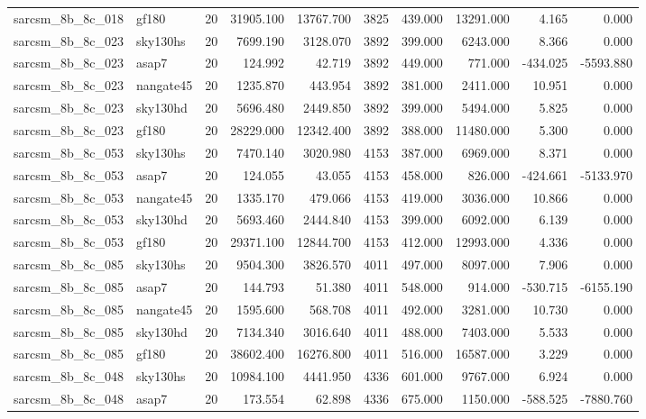 \documentclass{article}
\begin{document}
\begin{longtable}{llrrrrrrrr}
sarcsm\_8b\_8c\_018 & gf180 & 20 & 31905.100 & 13767.700 & 3825 & 439.000 & 13291.000 & 4.165 & 0.000 \\
sarcsm\_8b\_8c\_023 & sky130hs & 20 & 7699.190 & 3128.070 & 3892 & 399.000 & 6243.000 & 8.366 & 0.000 \\
sarcsm\_8b\_8c\_023 & asap7 & 20 & 124.992 & 42.719 & 3892 & 449.000 & 771.000 & -434.025 & -5593.880 \\
sarcsm\_8b\_8c\_023 & nangate45 & 20 & 1235.870 & 443.954 & 3892 & 381.000 & 2411.000 & 10.951 & 0.000 \\
sarcsm\_8b\_8c\_023 & sky130hd & 20 & 5696.480 & 2449.850 & 3892 & 399.000 & 5494.000 & 5.825 & 0.000 \\
sarcsm\_8b\_8c\_023 & gf180 & 20 & 28229.000 & 12342.400 & 3892 & 388.000 & 11480.000 & 5.300 & 0.000 \\
sarcsm\_8b\_8c\_053 & sky130hs & 20 & 7470.140 & 3020.980 & 4153 & 387.000 & 6969.000 & 8.371 & 0.000 \\
sarcsm\_8b\_8c\_053 & asap7 & 20 & 124.055 & 43.055 & 4153 & 458.000 & 826.000 & -424.661 & -5133.970 \\
sarcsm\_8b\_8c\_053 & nangate45 & 20 & 1335.170 & 479.066 & 4153 & 419.000 & 3036.000 & 10.866 & 0.000 \\
sarcsm\_8b\_8c\_053 & sky130hd & 20 & 5693.460 & 2444.840 & 4153 & 399.000 & 6092.000 & 6.139 & 0.000 \\
sarcsm\_8b\_8c\_053 & gf180 & 20 & 29371.100 & 12844.700 & 4153 & 412.000 & 12993.000 & 4.336 & 0.000 \\
sarcsm\_8b\_8c\_085 & sky130hs & 20 & 9504.300 & 3826.570 & 4011 & 497.000 & 8097.000 & 7.906 & 0.000 \\
sarcsm\_8b\_8c\_085 & asap7 & 20 & 144.793 & 51.380 & 4011 & 548.000 & 914.000 & -530.715 & -6155.190 \\
sarcsm\_8b\_8c\_085 & nangate45 & 20 & 1595.600 & 568.708 & 4011 & 492.000 & 3281.000 & 10.730 & 0.000 \\
sarcsm\_8b\_8c\_085 & sky130hd & 20 & 7134.340 & 3016.640 & 4011 & 488.000 & 7403.000 & 5.533 & 0.000 \\
sarcsm\_8b\_8c\_085 & gf180 & 20 & 38602.400 & 16276.800 & 4011 & 516.000 & 16587.000 & 3.229 & 0.000 \\
sarcsm\_8b\_8c\_048 & sky130hs & 20 & 10984.100 & 4441.950 & 4336 & 601.000 & 9767.000 & 6.924 & 0.000 \\
sarcsm\_8b\_8c\_048 & asap7 & 20 & 173.554 & 62.898 & 4336 & 675.000 & 1150.000 & -588.525 & -7880.760 \\

\end{longtable}
\end{document}
